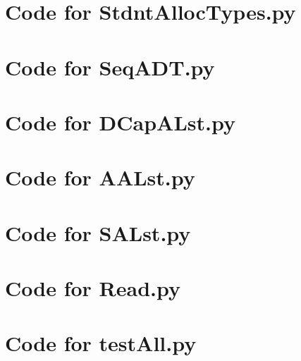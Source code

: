 \documentclass[12pt]{article}
\begin{document}
\newpage

\lstset{language=Python, basicstyle=\tiny, breaklines=true, showspaces=false,
  showstringspaces=false, breakatwhitespace=true}

\def\thesection{\Alph{section}}

\section{Code for StdntAllocTypes.py}

\noindent 

\newpage

\section{Code for SeqADT.py}

\noindent 

\newpage

\section{Code for DCapALst.py}

\noindent 

\newpage

\section{Code for AALst.py}

\noindent 

\newpage

\section{Code for SALst.py}

\noindent 

\newpage

\section{Code for Read.py}

\noindent 

\newpage

\section{Code for testAll.py}
\end{document}
